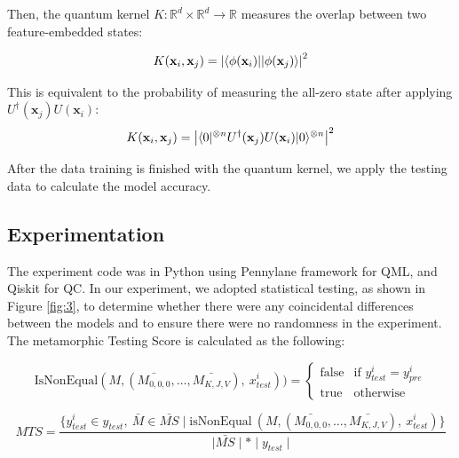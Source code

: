 \documentclass[12pt,a4paper]{article}
\DeclarePairedDelimiter\bra{\langle}{\rvert}
\DeclarePairedDelimiter\ket{\lvert}{\rangle}
\begin{document}
	Then, the quantum kernel $K: \mathbb{R}^d \times \mathbb{R}^d \to \mathbb{R}$ measures the overlap between two feature-embedded states:
	
	\begin{equation}
		K(\mathbf{x}_i, \mathbf{x}_j) = \left| \bra{\phi(\mathbf{x}_i)} \ket{\phi(\mathbf{x}_j)} \right|^2
	\end{equation}
	
	This is equivalent to the probability of measuring the all-zero state after applying $U^\dagger(\mathbf{x}_j)U(\mathbf{x}_i)$:
	\begin{equation}
		K(\mathbf{x}_i, \mathbf{x}_j) = \left| \bra{0}^{\otimes n} U^\dagger(\mathbf{x}_j) U(\mathbf{x}_i) \ket{0}^{\otimes n} \right|^2
	\end{equation}
	
	After the data training is finished with the quantum kernel, we apply the testing data to calculate the model accuracy.
	
	\subsection{Experimentation}
	
	The experiment code was in Python using Pennylane framework for QML, and Qiskit for QC. In our experiment, we adopted statistical testing, as shown in Figure \ref{fig:3}, to determine whether there were any coincidental differences between the models and to ensure there were no randomness \cite{10.1145/1985793.1985795} in the experiment. The metamorphic Testing Score is calculated as the following:
	
	\[
	\text{IsNonEqual}(M, (\bar{M_{0,0,0}}, \ldots, \bar{M_{K,J,V}}),\  x_{test}^i)) =
	\begin{cases} 
		\text{false} & \text{if } y^i_{test} = y^i_{pre} 
		\\
		\text{true} & \text{otherwise}
	\end{cases}
	\]
	
	\begin{equation}
		\label{eq:MTS}
		MTS =  \frac{\{y^i_{test} \in y_{test},\ {\bar{M}} \in \bar{MS} \mid \text{isNonEqual} \ (M, (\bar{M_{0,0,0}}, \ldots, \bar{M_{K,J,V}}),\  x_{test}^i)\}}{\mid \bar{MS} \mid * \mid y_{test} \mid} 
	\end{equation}
	
\end{document}
